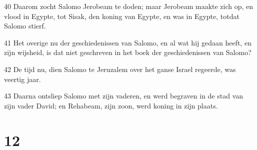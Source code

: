 \par 40 Daarom zocht Salomo Jerobeam te doden; maar Jerobeam maakte zich op, en vlood in Egypte, tot Sisak, den koning van Egypte, en was in Egypte, totdat Salomo stierf.
\par 41 Het overige nu der geschiedenissen van Salomo, en al wat hij gedaan heeft, en zijn wijsheid, is dat niet geschreven in het boek der geschiedenissen van Salomo?
\par 42 De tijd nu, dien Salomo te Jeruzalem over het ganse Israel regeerde, was veertig jaar.
\par 43 Daarna ontsliep Salomo met zijn vaderen, en werd begraven in de stad van zijn vader David; en Rehabeam, zijn zoon, werd koning in zijn plaats.

\chapter{12}

